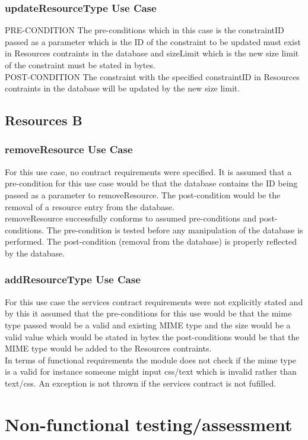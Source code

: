\documentclass[a4paper]{article}
\begin{document}
\subsubsection{updateResourceType Use Case}
PRE-CONDITION
The pre-conditions which in this case is the constraintID passed as a parameter which is the ID of the constraint to be updated must exist in Resources contraints in the database and sizeLimit which is the new size limit of the constraint must be stated in bytes.
\\
POST-CONDITION
The constraint with the specified constraintID in Resources contraints in the database will be updated by the new size limit.
\subsection {Resources B}
\subsubsection{removeResource Use Case}
For this use case, no contract requirements were specified. It is assumed that a pre-condition for this use case would be that the database contains the ID being passed as a parameter to removeResource. The post-condition would be the removal of a resource entry from the database.
\\
removeResource successfully conforms to assumed pre-conditions and post-conditions. The pre-condition is tested before any manipulation of the database is performed. The post-condition (removal from the database) is properly reflected by the database.

\subsubsection{addResourceType Use Case}
For this use case the services contract requirements were not explicitly stated and by this it assumed that the pre-conditions for this use would be that the mime type passed would be a valid and existing MIME type and the size would be a valid value which would be stated in bytes the post-conditions would be that the MIME type would be added to the Resources contraints.
\\
In terms of functional requirements the module does not check if the mime type is a valid for instance someone might input css/text which is invalid rather than text/css. An exception is not thrown if the services contract is not fufilled.

\section {Non-functional testing/assessment}
\end{document}
